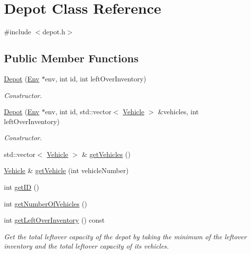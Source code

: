 \hypertarget{class_depot}{}\section{Depot Class Reference}
\label{class_depot}


{\ttfamily \#include $<$depot.\+h$>$}

\subsection*{Public Member Functions}
\begin{DoxyCompactItemize}
\item 
\hyperlink{class_depot_ae5be13d5305f06443d8941be30ca5e71}{Depot} (\hyperlink{class_env}{Env} $\ast$env, int id, int left\+Over\+Inventory)
\begin{DoxyCompactList}\small\item\em Constructor. \end{DoxyCompactList}\item 
\hyperlink{class_depot_a105364e1e00f7d359538838b2c1e81f6}{Depot} (\hyperlink{class_env}{Env} $\ast$env, int id, std\+::vector$<$ \hyperlink{class_vehicle}{Vehicle} $>$ \&vehicles, int left\+Over\+Inventory)
\begin{DoxyCompactList}\small\item\em Constructor. \end{DoxyCompactList}\item 
std\+::vector$<$ \hyperlink{class_vehicle}{Vehicle} $>$ \& \hyperlink{class_depot_a7ebccd66bec499d9dc7411dc78efc348}{get\+Vehicles} ()
\item 
\hyperlink{class_vehicle}{Vehicle} \& \hyperlink{class_depot_afd012e808f49e162b9713b75fd43c604}{get\+Vehicle} (int vehicle\+Number)
\item 
int \hyperlink{class_depot_a4c45e9fa5fca7ad3db018f20ae80d774}{get\+ID} ()
\item 
int \hyperlink{class_depot_aa8fa0abff367255b9d908c4e8fb93227}{get\+Number\+Of\+Vehicles} ()
\item 
int \hyperlink{class_depot_a443f83f05f5b5f939f5f7d67a615239a}{get\+Left\+Over\+Inventory} () const
\begin{DoxyCompactList}\small\item\em Get the total leftover capacity of the depot by taking the minimum of the leftover inventory and the total leftover capacity of its vehicles. \end{DoxyCompactList}\item 

\end{DoxyCompactItemize}
